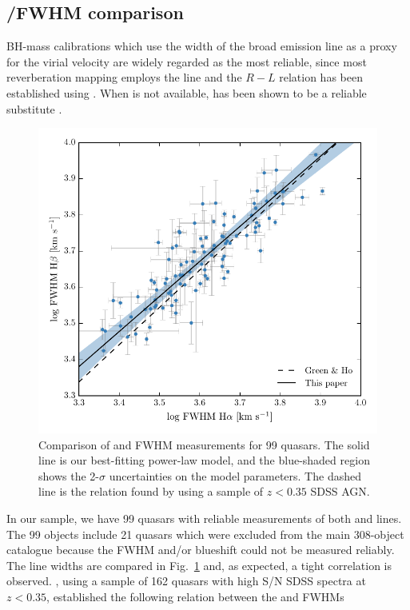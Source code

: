 \subsection{\hans/\hb FWHM comparison}
\label{sec:hahbcomparison}

BH-mass calibrations which use the width of the broad \hb emission line as a proxy for the virial velocity are widely regarded as the most reliable, since most reverberation mapping employs the \hb line and the $R-L$ relation has been established using \hbns.
When \hb is not available, \ha has been shown to be a reliable substitute \citep[e.g.][]{greene05b,shen11,shen12}. 

\begin{figure}
    \centering 
    \includegraphics[width=0.8\columnwidth]{figures/chapter03/ha_hb_width_comparison.pdf} 
    \caption{Comparison of \ha and \hb FWHM measurements for 99 quasars. The solid line is our best-fitting power-law model, and the blue-shaded region shows the 2-$\sigma$ uncertainties on the model parameters. The dashed line is the relation found by \citet{greene05b} using a sample of $z<0.35$ SDSS AGN.} 
    \label{fig:hahbcomp}
\end{figure}

In our sample, we have 99 quasars with reliable measurements of both \ha and \hb lines. 
The 99 objects include 21 quasars which were excluded from the main 308-object catalogue because the  FWHM and/or blueshift could not be measured reliably. 
The line widths are compared in Fig.~\ref{fig:hahbcomp} and, as expected, a tight correlation is observed.  
\citet{greene05b}, using a sample of 162 quasars with high S/N SDSS spectra at $z < 0.35$, established the following relation between the \ha and \hb FWHMs

